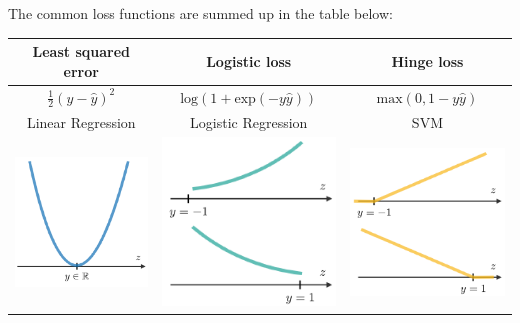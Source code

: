 \documentclass[letterpaper, 10.5pt,landscape]{article}
\begin{document}
\begin{multicols*}{3}
The common loss functions are summed up in the table below:
\vspace{-5pt}
\begin{center}
    \begin{tabular}{c|c|c}
            \textbf{Least squared error} & \textbf{Logistic loss} & \textbf{Hinge loss} \\
            \hline
             $\frac{1}{2}(y-\hat{y})^{2}$ & $\text{log}\left(1+\text{exp}(-y\hat{y})\right)$ & $\text{max}(0, 1-y\hat{y})$  \\
            \hline 
            Linear Regression & Logistic Regression & SVM \\
            \hline
            \includegraphics[scale = 0.4]{figures/least_squared_loss_func.PNG} &
            \includegraphics[scale = 0.4]{figures/logistic_loss_func.PNG} &
            \includegraphics[scale = 0.4]{figures/hinge_loss_func.PNG}
    \end{tabular}
\end{center}




\end{multicols*}
\end{document}
